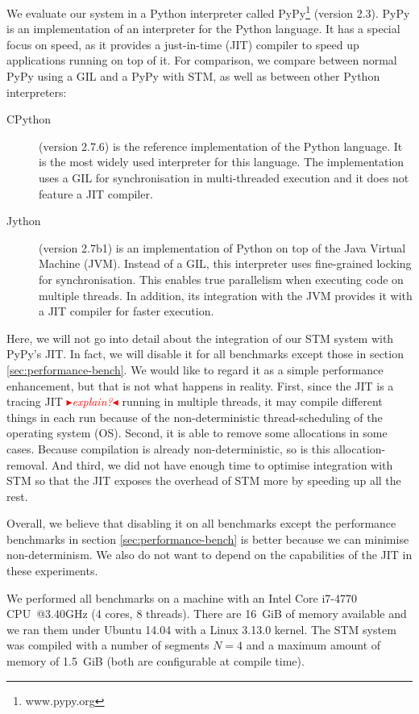 \documentclass{sigplanconf}
\newcommand{\mynote}[2]{%
  \textcolor{red}{%
    \fbox{\bfseries\sffamily\scriptsize#1}%
    {\small$\blacktriangleright$\textsf{\emph{#2}}$\blacktriangleleft$}%
  }%
}
\newcommand\remi[1]{\mynote{Remi}{#1}}
\begin{document}
We evaluate our system in a Python interpreter called
PyPy\footnote{www.pypy.org} (version 2.3). PyPy is an implementation of an
interpreter for the Python language. It has a special focus on speed,
as it provides a just-in-time (JIT) compiler to speed up applications
running on top of it. For comparison, we compare between normal PyPy
using a GIL and a PyPy with STM, as well as between other Python interpreters:
\begin{description}
\item[CPython] (version 2.7.6) is the reference implementation of the Python
  language. It is the most widely used interpreter for this language.
  The implementation uses a GIL for synchronisation in multi-threaded
  execution and it does not feature a JIT compiler.
\item[Jython] (version 2.7b1) is an implementation of Python on top of
  the Java Virtual Machine (JVM). Instead of a GIL, this interpreter
  uses fine-grained locking for synchronisation. This enables true
  parallelism when executing code on multiple threads. In addition, its
  integration with the JVM provides it with a JIT compiler for faster
  execution.
\end{description}

Here, we will not go into detail about the integration of our STM
system with PyPy's JIT. In fact, we will disable it for all benchmarks
except those in section \ref{sec:performance-bench}. We would like to
regard it as a simple performance enhancement, but that is not what
happens in reality. First, since the JIT is a tracing
JIT\remi{explain?}  running in multiple threads, it may compile
different things in each run because of the non-deterministic
thread-scheduling of the operating system (OS). Second, it is able to
remove some allocations in some cases. Because compilation is already
non-deterministic, so is this allocation-removal. And third, we did
not have enough time to optimise integration with STM so that the JIT
exposes the overhead of STM more by speeding up all the rest.

Overall, we believe that disabling it on all benchmarks except the
performance benchmarks in section \ref{sec:performance-bench} is better
because we can minimise non-determinism. We also do not want to depend
on the capabilities of the JIT in these experiments.

We performed all benchmarks on a machine with an Intel Core i7-4770
CPU~@3.40GHz (4 cores, 8 threads).  There are 16~GiB of memory
available and we ran them under Ubuntu 14.04 with a Linux 3.13.0
kernel. The STM system was compiled with a number of segments $N=4$
and a maximum amount of memory of 1.5~GiB (both are configurable at
compile time).
\end{document}
